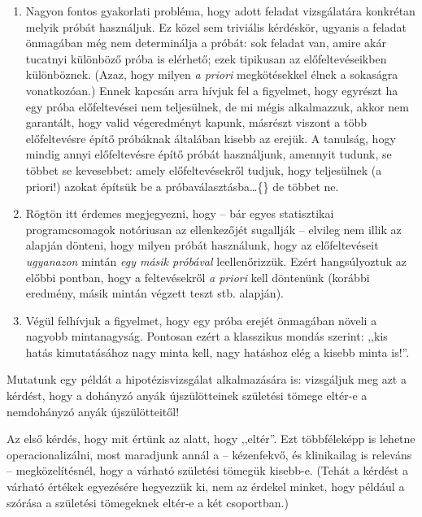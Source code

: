 \documentclass[]{book}
\providecommand{\tightlist}{%
  \setlength{\itemsep}{0pt}\setlength{\parskip}{0pt}}
\begin{document}
\begin{enumerate}
\def\labelenumi{\arabic{enumi}.}
\tightlist
\item
  Nagyon fontos gyakorlati probléma, hogy adott feladat vizsgálatára konkrétan melyik próbát használjuk. Ez közel sem triviális kérdéskör, ugyanis a feladat önmagában még nem determinálja a próbát: sok feladat van, amire akár tucatnyi különböző próba is elérhető; ezek tipikusan az előfeltevéseikben különböznek. (Azaz, hogy milyen \emph{a priori} megkötésekkel élnek a sokaságra vonatkozóan.) Ennek kapcsán arra hívjuk fel a figyelmet, hogy egyrészt ha egy próba előfeltevései nem teljesülnek, de mi mégis alkalmazzuk, akkor nem garantált, hogy valid végeredményt kapunk, másrészt viszont a több előfeltevésre építő próbáknak általában kisebb az erejük. A tanulság, hogy mindig annyi előfeltevésre építő próbát használjunk, amennyit tudunk, se többet se kevesebbet: amely előfeltevésekről tudjuk, hogy teljesülnek (a priori!) azokat építsük be a próbaválasztásba\dots\{\} de többet ne.
\item
  Rögtön itt érdemes megjegyezni, hogy -- bár egyes statisztikai programcsomagok notóriusan az ellenkezőjét sugallják -- elvileg nem illik az alapján dönteni, hogy milyen próbát használunk, hogy az előfeltevéseit \emph{ugyanazon} mintán \emph{egy másik próbával} leellenőrizzük. Ezért hangsúlyoztuk az előbbi pontban, hogy a feltevésekről \emph{a priori} kell döntenünk (korábbi eredmény, másik mintán végzett teszt stb. alapján).
\item
  Végül felhívjuk a figyelmet, hogy egy próba erejét önmagában növeli a nagyobb mintanagyság. Pontosan ezért a klasszikus mondás szerint: ,,kis hatás kimutatásához nagy minta kell, nagy hatáshoz elég a kisebb minta is!''.
\end{enumerate}

Mutatunk egy példát a hipotézisvizsgálat alkalmazására is: vizsgáljuk meg azt a kérdést, hogy a dohányzó anyák újszülötteinek születési tömege eltér-e a nemdohányzó anyák újszülötteitől!

Az első kérdés, hogy mit értünk az alatt, hogy ,,eltér''. Ezt többféleképp is lehetne operacionalizálni, most maradjunk annál a -- kézenfekvő, és klinikailag is releváns -- megközelítésnél, hogy a várható születési tömegük kisebb-e. (Tehát a kérdést a várható értékek egyezésére hegyezzük ki, nem az érdekel minket, hogy például a szórása a születési tömegeknek eltér-e a két csoportban.)
\end{document}
